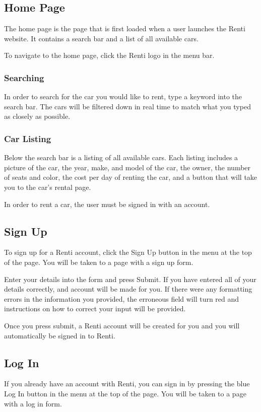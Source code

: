 \documentclass{article}
\begin{document}
\subsection{Home Page}
The home page is the page that is first loaded when a user launches the Renti website. It contains a search bar and a list of all available cars.

To navigate to the home page, click the Renti logo in the menu bar.

\subsubsection{Searching}
In order to search for the car you would like to rent, type a keyword into the search bar. The cars will be filtered down in real time to match what you typed as closely as possible.

\subsubsection{Car Listing}
Below the search bar is a listing of all available cars. Each listing includes a picture of the car, the year, make, and model of the car, the owner, the number of seats and color, the cost per day of renting the car, and a button that will take you to the car's rental page.

In order to rent a car, the user must be signed in with an account.

\subsection{Sign Up}
To sign up for a Renti account, click the Sign Up button in the menu at the top of the page. You will be taken to a page with a sign up form.

Enter your details into the form and press Submit. If you have entered all of your details correctly, and account will be made for you. If there were any formatting errors in the information you provided, the erroneous field will turn red and instructions on how to correct your input will be provided.

Once you press submit, a Renti account will be created for you and you will automatically be signed in to Renti.

\subsection{Log In}
If you already have an account with Renti, you can sign in by pressing the blue Log In button in the menu at the top of the page. You will be taken to a page with a log in form.
\end{document}
